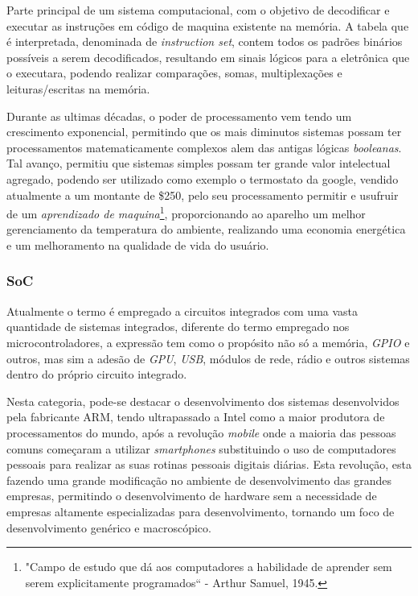 Parte principal de um sistema computacional, com o objetivo de decodificar e executar as instruções em código de maquina existente
na memória. A tabela que é interpretada, denominada de \textit{instruction set}, contem todos os padrões binários possíveis
a serem decodificados, resultando em sinais lógicos para a eletrônica que o executara, podendo realizar comparações, somas,
multiplexações e leituras/escritas na memória.

Durante as ultimas décadas, o poder de processamento vem tendo um crescimento exponencial, permitindo que os mais diminutos sistemas possam ter processamentos matematicamente complexos alem das antigas lógicas \textit{booleanas}. Tal avanço, permitiu que sistemas simples possam ter grande valor intelectual agregado, podendo ser utilizado como exemplo o termostato da google, vendido atualmente a um montante de \$250, pelo seu processamento permitir e usufruir de um \textit{aprendizado de maquina}\footnote{"Campo de estudo que dá aos computadores a habilidade de aprender sem serem explicitamente programados`` -  Arthur Samuel, 1945.}, proporcionando ao aparelho um melhor gerenciamento da temperatura do ambiente, realizando uma economia energética e um melhoramento na qualidade de vida do usuário.

\subsubsection{SoC}

Atualmente o termo é empregado a circuitos integrados com uma vasta quantidade de sistemas integrados, diferente do
termo empregado nos microcontroladores, a expressão tem como o propósito não só a memória, \textit{GPIO} e outros, mas sim
a adesão de \textit{GPU}, \textit{USB}, módulos de rede, rádio e outros sistemas dentro do próprio circuito integrado.


Nesta categoria, pode-se destacar o desenvolvimento dos sistemas desenvolvidos pela fabricante ARM, tendo ultrapassado a Intel como a maior produtora de processamentos do mundo, após a revolução \textit{mobile} onde a maioria das pessoas comuns começaram a utilizar \textit{smartphones} substituindo o uso de computadores pessoais para realizar as suas rotinas pessoais digitais diárias. Esta revolução, esta fazendo uma grande modificação no ambiente de desenvolvimento das grandes empresas, permitindo o desenvolvimento de hardware sem a necessidade de empresas altamente especializadas para desenvolvimento, tornando um foco de desenvolvimento genérico e macroscópico.


